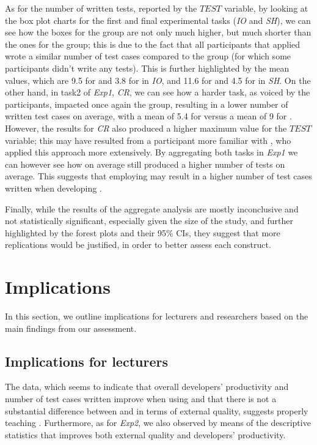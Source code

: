 As for the number of written tests, reported by the $TEST$ variable, by looking at the box plot charts for the first and final experimental tasks (\ie \textit{IO} and \textit{SH}), we can see how the boxes for the \tdd group are not only much higher, but much shorter than the ones for the \notdd group; this is due to the fact that all participants that applied \tdd wrote a similar number of test cases compared to the \notdd group (for which some participants didn't write any tests).
This is further highlighted by the mean values, which are 9.5 for \tdd and 3.8 for \notdd in \textit{IO}, and 11.6 for \tdd and 4.5 for \notdd in \textit{SH}.
On the other hand, in task2 of \textit{Exp1}, \textit{CR}, we can see how a harder task, as voiced by the participants, impacted once again the \tdd group, resulting in a lower number of written test cases on average, with a mean of 5.4 for \tdd versus a mean of 9 for \notdd. However, the results for \textit{CR} also produced a higher maximum value for the $TEST$ variable; this may have resulted from a participant more familiar with \tdd, who applied this approach more extensively.
By aggregating both tasks in \textit{Exp1} we can however see how on average \tdd still produced a higher number of tests on average. 
This suggests that employing \tdd may result in a higher number of test cases written when developing \ess.

Finally, while the results of the aggregate analysis are mostly inconclusive and not statistically significant, especially given the size of the study, and further highlighted by the forest plots and their 95\% CIs, they suggest that more replications would be justified, in order to better assess each construct.


\section{Implications}
In this section, we outline implications for lecturers and researchers based on the main findings from our assessment. 

\subsection{Implications for lecturers}
The data, which seems to indicate that overall developers' productivity and number of test cases written improve when using \tdd and that there is not a substantial difference between \tdd and \notdd in terms of external quality, suggests properly teaching \tdd. Furthermore, as for \textit{Exp2}, we also observed by means of the descriptive statistics that \tdd improves both external quality and developers' productivity. 

